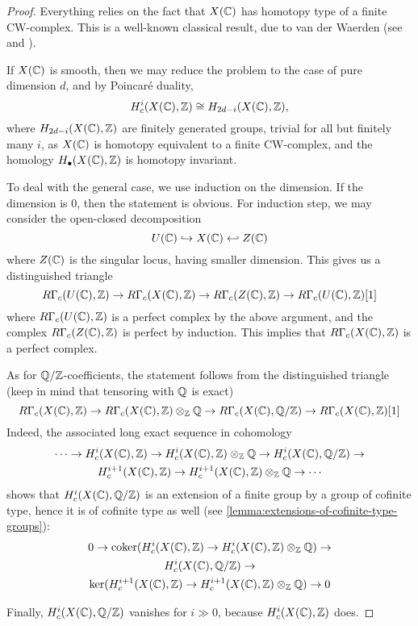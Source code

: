 \begin{proof}
  Everything relies on the fact that $X (\mathbb{C})$ has homotopy type of a finite
  CW-complex. This is a well-known classical result, due to van der Waerden
  (see \cite{van-der-Waerden-30} and \cite{Lefschetz-Whitehead-33}).

  If $X (\mathbb{C})$ is smooth, then we may reduce the problem to the case of pure
  dimension $d$, and by Poincaré duality,
  $$H^i_c (X (\mathbb{C}), \mathbb{Z}) \cong H_{2d-i} (X (\mathbb{C}), \mathbb{Z}),$$
  where $H_{2d-i} (X (\mathbb{C}), \mathbb{Z})$ are finitely generated groups, trivial for all
  but finitely many $i$, as $X (\mathbb{C})$ is homotopy equivalent to a finite
  CW-complex, and the homology $H_\bullet (X (\mathbb{C}), \mathbb{Z})$ is homotopy invariant.

  To deal with the general case, we use induction on the dimension. If the
  dimension is $0$, then the statement is obvious. For induction step, we may
  consider the open-closed decomposition
  $$U (\mathbb{C}) \hookrightarrow X (\mathbb{C}) \hookleftarrow Z (\mathbb{C})$$
  where $Z (\mathbb{C})$ is the singular locus, having smaller dimension. This gives us
  a distinguished triangle
  \[ R\Gamma_c (U (\mathbb{C}), \mathbb{Z}) \to
    R\Gamma_c (X (\mathbb{C}), \mathbb{Z}) \to
    R\Gamma_c (Z (\mathbb{C}), \mathbb{Z}) \to
    R\Gamma_c (U (\mathbb{C}), \mathbb{Z}) [1] \]
  where $R\Gamma_c (U (\mathbb{C}), \mathbb{Z})$ is a perfect complex by the above argument,
  and the complex $R\Gamma_c (Z (\mathbb{C}), \mathbb{Z})$ is perfect by induction. This
  implies that $R\Gamma_c (X (\mathbb{C}), \mathbb{Z})$ is a perfect complex.

  As for $\mathbb{Q}/\mathbb{Z}$-coefficients, the statement follows from the distinguished
  triangle (keep in mind that tensoring with $\mathbb{Q}$ is exact)
  \[ R\Gamma_c (X (\mathbb{C}), \mathbb{Z}) \to
    R\Gamma_c (X (\mathbb{C}), \mathbb{Z})\otimes_{\mathbb{Z}} \mathbb{Q} \to
    R\Gamma_c (X (\mathbb{C}), \mathbb{Q}/\mathbb{Z}) \to
    R\Gamma_c (X (\mathbb{C}), \mathbb{Z}) [1] \]
  Indeed, the associated long exact sequence in cohomology
  \begin{multline*}
    \cdots \to H^i_c (X (\mathbb{C}), \mathbb{Z}) \to
    H^i_c (X (\mathbb{C}), \mathbb{Z})\otimes_{\mathbb{Z}} \mathbb{Q} \to
    H^i_c (X (\mathbb{C}), \mathbb{Q}/\mathbb{Z}) \to \\
    H^{i+1}_c (X (\mathbb{C}), \mathbb{Z}) \to
    H^{i+1}_c (X (\mathbb{C}), \mathbb{Z})\otimes_{\mathbb{Z}} \mathbb{Q} \to \cdots
  \end{multline*}
  shows that $H^i_c (X (\mathbb{C}), \mathbb{Q}/\mathbb{Z})$ is an extension of a finite group by a
  group of cofinite type, hence it is of cofinite type as well
  (see \ref{lemma:extensions-of-cofinite-type-groups}):
  \begin{multline*}
    0 \to \operatorname{coker} (H^i_c (X (\mathbb{C}), \mathbb{Z}) \to
    H^i_c (X (\mathbb{C}), \mathbb{Z})\otimes_{\mathbb{Z}} \mathbb{Q}) \to \\
    H^i_c (X (\mathbb{C}), \mathbb{Q}/\mathbb{Z}) \to \\
    \ker (H^{i+1}_c (X (\mathbb{C}), \mathbb{Z}) \to
    H^{i+1}_c (X (\mathbb{C}), \mathbb{Z})\otimes_{\mathbb{Z}} \mathbb{Q}) \to 0
  \end{multline*}

  Finally, $H^i_c (X (\mathbb{C}), \mathbb{Q}/\mathbb{Z})$ vanishes for $i \gg 0$, because
  $H^i_c (X (\mathbb{C}), \mathbb{Z})$ does.
\end{proof}

